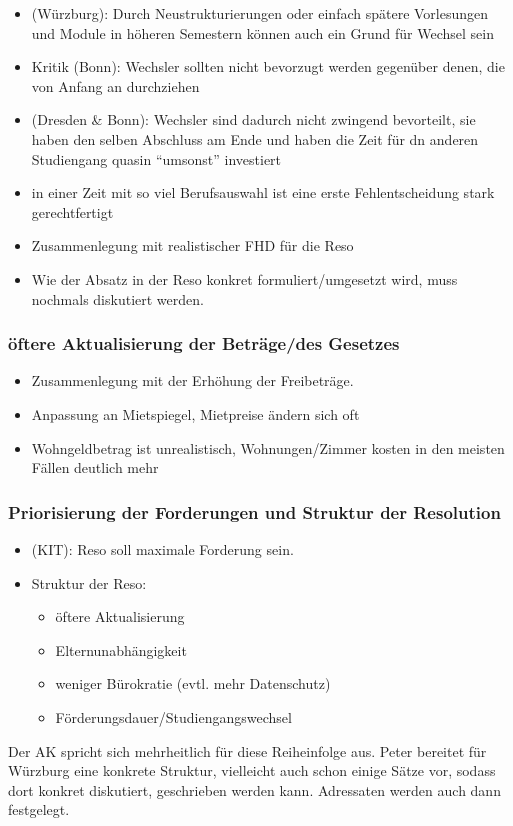 \begin{itemize}
        \item (Würzburg): Durch Neustrukturierungen oder einfach spätere Vorlesungen und Module in höheren Semestern können auch ein Grund für Wechsel sein
        \item Kritik (Bonn): Wechsler sollten nicht bevorzugt werden gegenüber denen, die von Anfang an durchziehen
        \item (Dresden \& Bonn): Wechsler sind dadurch nicht zwingend bevorteilt, sie haben den selben Abschluss am Ende und haben die Zeit für dn anderen Studiengang quasin “umsonst” investiert
        \item in einer Zeit mit so viel Berufsauswahl ist eine erste Fehlentscheidung stark gerechtfertigt
        \item Zusammenlegung mit realistischer FHD für die Reso
        \item Wie der Absatz in der Reso konkret formuliert/umgesetzt wird, muss nochmals diskutiert werden.
      \end{itemize}

    \subsubsection{öftere Aktualisierung der Beträge/des Gesetzes}
      \begin{itemize}
        \item Zusammenlegung mit der Erhöhung der Freibeträge.
        \item Anpassung an Mietspiegel, Mietpreise ändern sich oft
        \item Wohngeldbetrag ist unrealistisch, Wohnungen/Zimmer kosten in den meisten Fällen deutlich mehr
      \end{itemize}

    \subsubsection{Priorisierung der Forderungen und Struktur der Resolution}
      \begin{itemize}
        \item (KIT): Reso soll maximale Forderung sein.
        \item Struktur der Reso:
          \begin{itemize}
            \item öftere Aktualisierung
            \item Elternunabhängigkeit
            \item weniger Bürokratie (evtl. mehr Datenschutz)
            \item Förderungsdauer/Studiengangswechsel
          \end{itemize}
      \end{itemize}
\vspace{5mm}

Der AK spricht sich mehrheitlich für diese Reiheinfolge aus.
Peter bereitet für Würzburg eine konkrete Struktur, vielleicht auch schon einige Sätze vor, sodass dort konkret diskutiert, geschrieben werden kann. Adressaten werden auch dann festgelegt.
